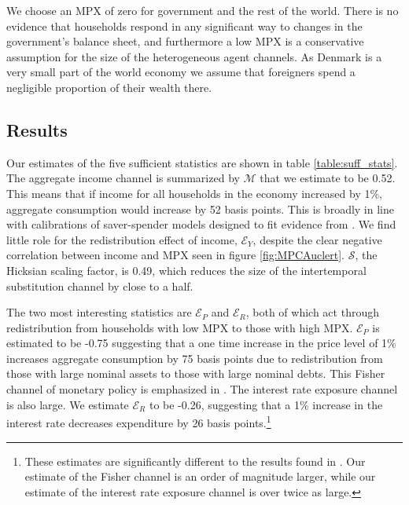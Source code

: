 \documentclass[titlepage]{\econtex}\newcommand{\texname}{ConsumptionHeterogeneity}
\begin{document}
We choose an MPX of zero for government and the rest of the world. There is no evidence that households respond in any significant way to changes in the government's balance sheet, and furthermore a low MPX is a conservative assumption for the size of the heterogeneous agent channels. As Denmark is a very small part of the world economy we assume that foreigners spend a negligible proportion of their wealth there.
\begin{center}
	\label{table:aggElas}
	
\end{center}

\subsection{Results}
Our estimates of the five sufficient statistics are shown in table \ref{table:suff_stats}. The aggregate income channel is summarized by $\mathcal{M}$ that we estimate to be 0.52. This means that if income for all households in the economy increased by 1\%, aggregate consumption would increase by 52 basis points. This is broadly in line with calibrations of saver-spender models designed to fit evidence from \cite{campbell_consumption_1989}. We find little role for the redistribution effect of income, $\mathcal{E}_Y$, despite the clear negative correlation between income and MPX seen in figure \ref{fig:MPCAuclert}. $\mathcal{S}$, the Hicksian scaling factor, is 0.49, which reduces the size of the intertemporal substitution channel by close to a half.

The two most interesting statistics are $\mathcal{E}_P$ and $\mathcal{E}_R$, both of which act through redistribution from households with low MPX to those with high MPX. $\mathcal{E}_P$ is estimated to be -0.75 suggesting that a one time increase in the price level of 1\% increases aggregate consumption by 75 basis points due to redistribution from those with large nominal assets to those with large nominal debts. This Fisher channel of monetary policy is emphasized in \cite{doepke_inflation_2006}. The interest rate exposure channel is also large. We estimate  $\mathcal{E}_R$ to be -0.26, suggesting that a 1\% increase in the interest rate decreases expenditure by 26 basis points.\footnote{These estimates are significantly different to the results found in \cite{auclert_monetary_2017}. Our estimate of the Fisher channel is an order of magnitude larger, while our estimate of the interest rate exposure channel is over twice as large.}
\end{document}

